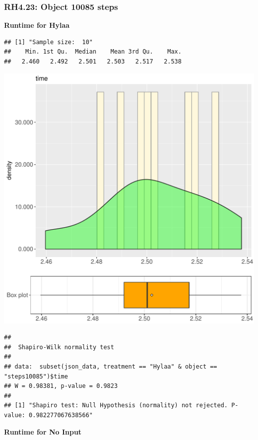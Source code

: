 \documentclass{article}\usepackage[]{graphicx}\usepackage[]{color}
\makeatletter
\def\maxwidth{ %
  \ifdim\Gin@nat@width>\linewidth
    \linewidth
  \else
    \Gin@nat@width
  \fi
}
\newenvironment{kframe}{%
 \def\at@end@of@kframe{}%
 \ifinner\ifhmode%
  \def\at@end@of@kframe{\end{minipage}}%
  \begin{minipage}{\columnwidth}%
 \fi\fi%
 \def\FrameCommand##1{\hskip\@totalleftmargin \hskip-\fboxsep
 \colorbox{shadecolor}{##1}\hskip-\fboxsep
     \hskip-\linewidth \hskip-\@totalleftmargin \hskip\columnwidth}%
 \MakeFramed {\advance\hsize-\width
   \@totalleftmargin\z@ \linewidth\hsize
   \@setminipage}}%
 {\par\unskip\endMakeFramed%
 \at@end@of@kframe}
\newenvironment{knitrout}{}{} %
\makeatother
\begin{document}
\subsubsection{RH4.23: Object 10085 steps}

 \textbf{Runtime for Hylaa}
\begin{knitrout}
\color{fgcolor}\begin{kframe}
\begin{verbatim}
## [1] "Sample size:  10"
##    Min. 1st Qu.  Median    Mean 3rd Qu.    Max. 
##   2.460   2.492   2.501   2.503   2.517   2.538
\end{verbatim}
\end{kframe}
\includegraphics[width=\maxwidth]{figure/RH4_Hylaa_steps10085-1} 
\begin{kframe}\begin{verbatim}
## 
## 	Shapiro-Wilk normality test
## 
## data:  subset(json_data, treatment == "Hylaa" & object == "steps10085")$time
## W = 0.98381, p-value = 0.9823
## 
## [1] "Shapiro test: Null Hypothesis (normality) not rejected. P-value: 0.982277067638566"
\end{verbatim}
\end{kframe}
\end{knitrout}
 \textbf{Runtime for No Input}
\end{document}
